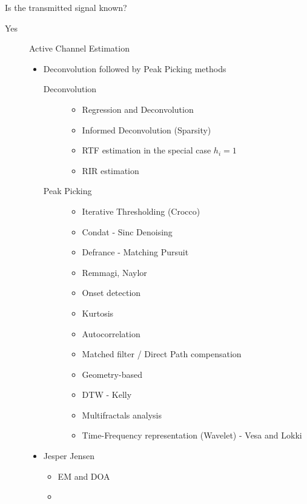 Is the transmitted signal known?
\begin{description}
    \item[Yes] Active Channel Estimation
    \begin{itemize}
        \item Deconvolution followed by Peak Picking methods
        \begin{description}
            \item[Deconvolution]
            \begin{itemize}
                \item Regression and Deconvolution
                \item Informed Deconvolution (Sparsity)
                \item RTF estimation in the special case $h_i = 1$
                \item RIR estimation 
            \end{itemize}
            \item[Peak Picking]
            \begin{itemize}
                \item Iterative Thresholding (Crocco)
                \item Condat - Sinc Denoising
                \item Defrance - Matching Pursuit
                \item Remmagi, Naylor
                \item Onset detection
                \item Kurtosis
                \item Autocorrelation
                \item Matched filter / Direct Path compensation
                \item Geometry-based
                \item DTW - Kelly
                \item Multifractals analysis
                \item Time-Frequency representation (Wavelet) - Vesa and Lokki
            \end{itemize}
        \end{description}
        \item Jesper Jensen
        \begin{itemize}
            \item EM and DOA
            \item
        \end{itemize}

\end{itemize}
\end{description}
